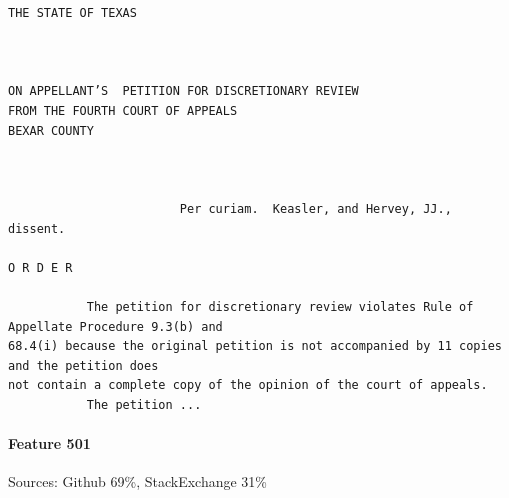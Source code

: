 \begin{verbatim}
THE STATE OF TEXAS



ON APPELLANT’S  PETITION FOR DISCRETIONARY REVIEW
FROM THE FOURTH COURT OF APPEALS
BEXAR COUNTY



                        Per curiam.  Keasler, and Hervey, JJ., dissent.

O R D E R 

           The petition for discretionary review violates Rule of Appellate Procedure 9.3(b) and
68.4(i) because the original petition is not accompanied by 11 copies and the petition does
not contain a complete copy of the opinion of the court of appeals.
           The petition ...

\end{verbatim}

\paragraph*{Feature 501} Sources: Github 69\%, StackExchange 31\%

